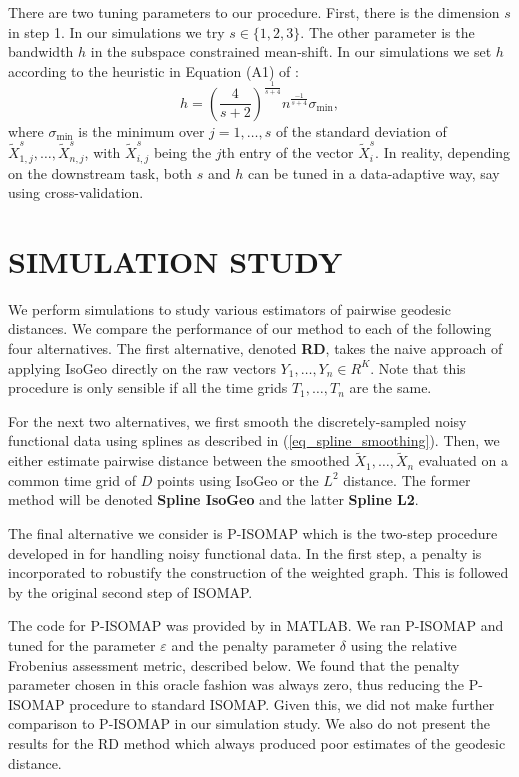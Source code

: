 There are two tuning parameters to our procedure. First, there is the
dimension \(s\) in step 1. In our simulations we try
\(s \in \{1,2,3\}\). The other parameter is the bandwidth \(h\) in the
subspace constrained mean-shift. In our simulations we set \(h\)
according to the heuristic in Equation (A1) of \cite{ChenHo2015}:
\[h = \left(\frac{4}{s+2}\right)^{\frac{1}{s+4}}n^{\frac{-1}{s+4}}\sigma_{\min}, \]
where \(\sigma_{\min}\) is the minimum over \(j=1,\ldots,s\) of the
standard deviation of \(\tilde X^s_{1,j},\ldots, \tilde X^s_{n,j}\),
with \(\tilde X^s_{i,j}\) being the \(j\)th entry of the vector
\(\tilde X^s_{i}\). In reality, depending on the downstream task, both
\(s\) and \(h\) can be tuned in a data-adaptive way, say using
cross-validation.

\section{SIMULATION STUDY}\label{simulation-study}

We perform simulations to study various estimators of pairwise geodesic
distances. We compare the performance of our method to each of the
following four alternatives. The first alternative, denoted \textbf{RD},
takes the naive approach of applying IsoGeo directly on the raw vectors
\(Y_1,\ldots,Y_n \in R^K\). Note that this procedure is only sensible if
all the time grids \(T_1,\ldots,T_n\) are the same.

For the next two alternatives, we first smooth the discretely-sampled
noisy functional data using splines as described in
(\ref{eq_spline_smoothing}). Then, we either estimate pairwise distance
between the smoothed \(\tilde X_1,\ldots,\tilde X_n\) evaluated on a
common time grid of \(D\) points using IsoGeo or the \(L^2\) distance.
The former method will be denoted \textbf{Spline IsoGeo} and the latter
\textbf{Spline L2}.

The final alternative we consider is P-ISOMAP which is the two-step
procedure developed in \cite{ChenMuller2012} for handling noisy
functional data. In the first step, a penalty is incorporated to
robustify the construction of the weighted graph. This is followed by
the original second step of ISOMAP.

The code for P-ISOMAP was provided by \cite{ChenMuller2012} in MATLAB.
We ran P-ISOMAP and tuned for the parameter \(\varepsilon\) and the
penalty parameter \(\delta\) using the relative Frobenius assessment
metric, described below. We found that the penalty parameter chosen in
this oracle fashion was always zero, thus reducing the P-ISOMAP
procedure to standard ISOMAP. Given this, we did not make further
comparison to P-ISOMAP in our simulation study. We also do not present
the results for the RD method which always produced poor estimates of
the geodesic distance.

